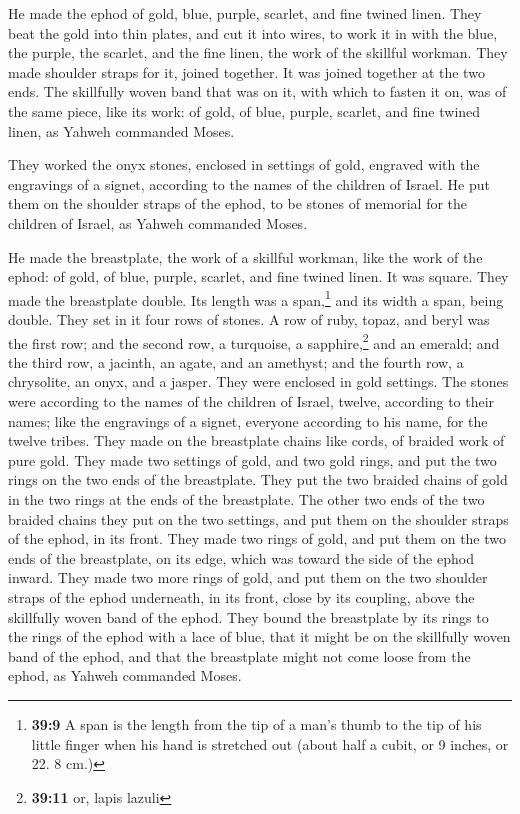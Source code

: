  He made the ephod of gold, blue, purple, scarlet, and
fine twined linen.  They beat the gold into thin plates,
and cut it into wires, to work it in with the blue, the purple, the
scarlet, and the fine linen, the work of the skillful workman.
 They made shoulder straps for it, joined together. It was
joined together at the two ends.  The skillfully woven
band that was on it, with which to fasten it on, was of the same piece,
like its work: of gold, of blue, purple, scarlet, and fine twined linen,
as Yahweh commanded Moses.

 They worked the onyx stones, enclosed in settings of
gold, engraved with the engravings of a signet, according to the names
of the children of Israel.  He put them on the shoulder
straps of the ephod, to be stones of memorial for the children of
Israel, as Yahweh commanded Moses.

 He made the breastplate, the work of a skillful workman,
like the work of the ephod: of gold, of blue, purple, scarlet, and fine
twined linen.  It was square. They made the breastplate
double. Its length was a span,\footnote{\textbf{39:9} A span is the
  length from the tip of a man's thumb to the tip of his little finger
  when his hand is stretched out (about half a cubit, or 9 inches, or
  22. 8 cm.)} and its width a span, being double.  They
set in it four rows of stones. A row of ruby, topaz, and beryl was the
first row;  and the second row, a turquoise, a
sapphire,\footnote{\textbf{39:11} or, lapis lazuli} and an emerald;
 and the third row, a jacinth, an agate, and an amethyst;
 and the fourth row, a chrysolite, an onyx, and a jasper.
They were enclosed in gold settings.  The stones were
according to the names of the children of Israel, twelve, according to
their names; like the engravings of a signet, everyone according to his
name, for the twelve tribes.  They made on the
breastplate chains like cords, of braided work of pure gold.
 They made two settings of gold, and two gold rings, and
put the two rings on the two ends of the breastplate. 
They put the two braided chains of gold in the two rings at the ends of
the breastplate.  The other two ends of the two braided
chains they put on the two settings, and put them on the shoulder straps
of the ephod, in its front.  They made two rings of gold,
and put them on the two ends of the breastplate, on its edge, which was
toward the side of the ephod inward.  They made two more
rings of gold, and put them on the two shoulder straps of the ephod
underneath, in its front, close by its coupling, above the skillfully
woven band of the ephod.  They bound the breastplate by
its rings to the rings of the ephod with a lace of blue, that it might
be on the skillfully woven band of the ephod, and that the breastplate
might not come loose from the ephod, as Yahweh commanded Moses.

